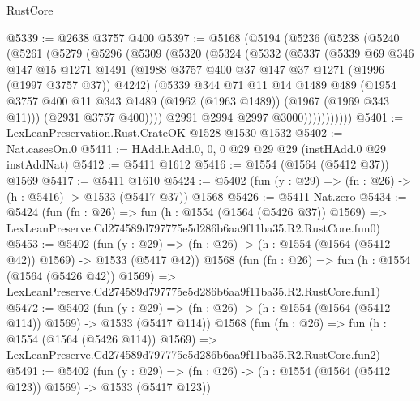 \begin{lexlean}{RustCore}
\begin{coremodule}
@5339 := @2638 @3757 @400
@5397 := @5168
    (@5194
      (@5236
        (@5238
          (@5240
            (@5261
              (@5279
                (@5296
                  (@5309
                    (@5320
                      (@5324
                        (@5332
                          (@5337
                            (@5339
                              @69
                              @346
                              @147
                              @15
                              @1271
                              @1491
                              (@1988 @3757 @400 @37 @147 @37 @1271 (@1996 (@1997 @3757 @37)) @4242)
                              (@5339
                                @344
                                @71
                                @11
                                @14
                                @1489
                                @489
                                (@1954
                                  @3757
                                  @400
                                  @11
                                  @343
                                  @1489
                                  (@1962 (@1963 @1489))
                                  (@1967 (@1969 @343 @11)))
                                (@2931 @3757 @400))))
                          @2991
                          @2994
                          @2997
                          @3000)))))))))))
@5401 := LexLeanPreservation.Rust.CrateOK @1528 @1530 @1532
@5402 := Nat.casesOn.{0}
@5411 := HAdd.hAdd.{0, 0, 0} @29 @29 @29 (instHAdd.{0} @29 instAddNat)
@5412 := @5411 @1612
@5416 := @1554 (@1564 (@5412 @37)) @1569
@5417 := @5411 @1610
@5424 := @5402 (fun (y : @29) => (fn : @26) -> (h : @5416) -> @1533 (@5417 @37)) @1568
@5426 := @5411 Nat.zero
@5434 := @5424
    (fun (fn : @26) =>
    fun (h : @1554 (@1564 (@5426 @37)) @1569) =>
    LexLeanPreserve.Cd274589d797775e5d286b6aa9f11ba35.R2.RustCore.fun0)
@5453 := @5402
    (fun (y : @29) => (fn : @26) -> (h : @1554 (@1564 (@5412 @42)) @1569) -> @1533 (@5417 @42))
    @1568
    (fun (fn : @26) =>
    fun (h : @1554 (@1564 (@5426 @42)) @1569) =>
    LexLeanPreserve.Cd274589d797775e5d286b6aa9f11ba35.R2.RustCore.fun1)
@5472 := @5402
    (fun (y : @29) => (fn : @26) -> (h : @1554 (@1564 (@5412 @114)) @1569) -> @1533 (@5417 @114))
    @1568
    (fun (fn : @26) =>
    fun (h : @1554 (@1564 (@5426 @114)) @1569) =>
    LexLeanPreserve.Cd274589d797775e5d286b6aa9f11ba35.R2.RustCore.fun2)
@5491 := @5402
    (fun (y : @29) => (fn : @26) -> (h : @1554 (@1564 (@5412 @123)) @1569) -> @1533 (@5417 @123))

\end{coremodule}
\end{lexlean}

